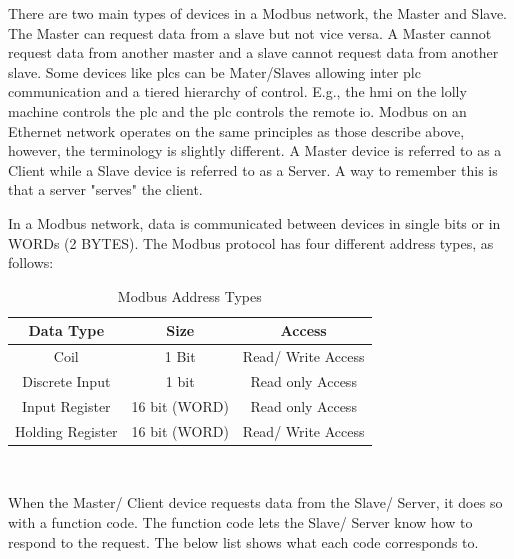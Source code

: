     There are two main types of devices in a Modbus network, the Master and Slave\cite{frenzel2015handbook}. The Master can request data from a slave but not vice versa. A Master cannot request data from another master and a slave cannot request data from another slave. Some devices like \acrshort{plc}s can be Mater/Slaves allowing inter \acrshort{plc} communication and a tiered hierarchy of control. E.g., the \acrshort{hmi} on the lolly machine controls the \acrshort{plc} and the \acrshort{plc} controls the remote \acrshort{io}. Modbus on an Ethernet network operates on the same principles as those describe above, however, the terminology is slightly different. A Master device is referred to as a Client while a Slave device is referred to as a Server. A way to remember this is that a server "serves" the client.
    
    In a Modbus network, data is communicated between devices in single bits or in WORDs (2 BYTES). 
    The Modbus protocol has four different address types, as follows:
    
        \begin{table}[H]
        \caption{Modbus Address Types}
        \begin{center}
            \begin{tabular}{ |c|c|c| }
                \hline
                \textbf{Data Type} & \textbf{Size} & \textbf{Access}\\ 
                \hline
                Coil                & 1 Bit         & Read/ Write Access\\
                Discrete Input      & 1 bit         & Read only Access\\
                Input Register      & 16 bit (WORD) & Read only Access\\
                Holding Register        & 16 bit (WORD) & Read/ Write Access\\
                \hline
            \end{tabular}\\
        \end{center}
        \label{table:modbusAddressTypes}
    \end{table}
    
    When the Master/ Client device requests data from the Slave/ Server, it does so with a function code. The function code lets the Slave/ Server know how to respond to the request. The below list shows what each code corresponds to. 

